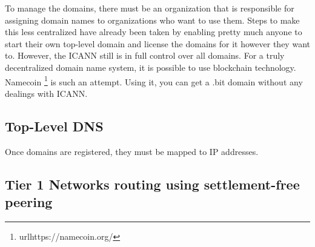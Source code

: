 \documentclass[a4paper]{article}
\begin{document}
To manage the domains, there must be an organization that is responsible for assigning domain names to organizations who want to use them. Steps to make this less centralized have already been taken by enabling pretty much anyone to start their own top-level domain and license the domains for it however they want to. However, the ICANN still is in full control over all domains.
For a truly decentralized domain name system, it is possible to use blockchain technology. Namecoin \footnote{url{https://namecoin.org/}} is such an attempt. Using it, you can get a .bit domain without any dealings with ICANN.

\subsection{Top-Level DNS}

Once domains are registered, they must be mapped to IP addresses. 

\subsection{Tier 1 Networks routing using settlement-free peering}
\end{document}
